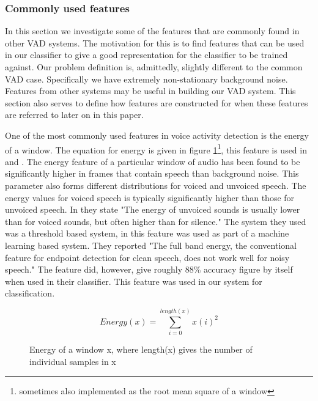 \documentclass[ %
                    author={Sam Phippen},
                supervisor={Dr. Rafal Bogacz},
                     title={Real time voice activity detectors in noisy personal computing environments},
                  subtitle={},
                    degree={MEng},
                      year={2012} ]{thesis}
\begin{document}
\subsubsection{Commonly used features}

In this section we investigate some of the features that are commonly found in
other VAD systems. The motivation for this is to find features that can be used
in our classifier to give a good representation for the classifier to be
trained against. Our problem definition is, admittedly, slightly different to
the common VAD case. Specifically we have extremely non-stationary background
noise. Features from other systems may be useful in building our VAD system.
This section also serves to define how features are constructed for when these
features are referred to later on in this paper.

One of the most commonly used features in voice activity detection is the
energy of a window. The equation for energy is given in figure
\ref{eqn:energy}\footnote{ sometimes also implemented as the root mean square
of a window}, this feature is used in
\cite{shin}\cite{sakhnov}\cite{gokhun}\cite{haigh}\cite{atal} and \cite{sohn2}.
The energy feature of a particular window of audio has been found to be
significantly higher in frames that contain speech than background
noise\cite{atal}. This parameter also forms different distributions for voiced
and unvoiced speech. The energy values for voiced speech is typically
significantly higher than those for unvoiced speech. In \cite{atal} they state
"The energy of unvoiced sounds is usually lower than for voiced sounds, but
often higher than for silence." The system they used was a threshold based system,
in \cite{shin} this feature was used as part of a machine learning based system.
They reported "The full band energy, the conventional feature for endpoint
detection for clean speech, does not work well for noisy speech." The feature
did, however, give roughly 88\% accuracy figure by itself when used in their
classifier. This feature was used in our system for classification.

\begin{figure}
    $$Energy(x) = \sum_{i=0}^{length(x)}x(i)^2$$
    \label{eqn:energy}
    \caption{Energy of a window x, where length(x) gives the number of individual
    samples in x}
\end{figure}
\end{document}
